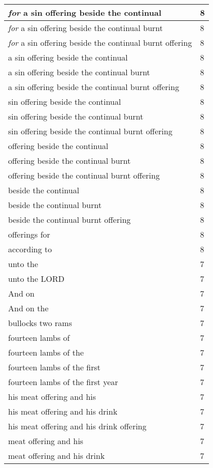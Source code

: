 \begin{center}
\begin{longtable}{|p{3.0in}|p{0.5in}|}
\emph{for} a sin offering beside the continual & 8\\ \hline 
\emph{for} a sin offering beside the continual burnt & 8\\ \hline 
\emph{for} a sin offering beside the continual burnt offering & 8\\ \hline 
a sin offering beside the continual & 8\\ \hline 
a sin offering beside the continual burnt & 8\\ \hline 
a sin offering beside the continual burnt offering & 8\\ \hline 
sin offering beside the continual & 8\\ \hline 
sin offering beside the continual burnt & 8\\ \hline 
sin offering beside the continual burnt offering & 8\\ \hline 
offering beside the continual & 8\\ \hline 
offering beside the continual burnt & 8\\ \hline 
offering beside the continual burnt offering & 8\\ \hline 
beside the continual & 8\\ \hline 
beside the continual burnt & 8\\ \hline 
beside the continual burnt offering & 8\\ \hline 
offerings for & 8\\ \hline 
according to & 8\\ \hline 
unto the & 7\\ \hline 
unto the LORD & 7\\ \hline 
And on & 7\\ \hline 
And on the & 7\\ \hline 
bullocks two rams & 7\\ \hline 
fourteen lambs of & 7\\ \hline 
fourteen lambs of the & 7\\ \hline 
fourteen lambs of the first & 7\\ \hline 
fourteen lambs of the first year & 7\\ \hline 
his meat offering and his & 7\\ \hline 
his meat offering and his drink & 7\\ \hline 
his meat offering and his drink offering & 7\\ \hline 
meat offering and his & 7\\ \hline 
meat offering and his drink & 7\\ \hline 

\end{longtable}
\end{center}
